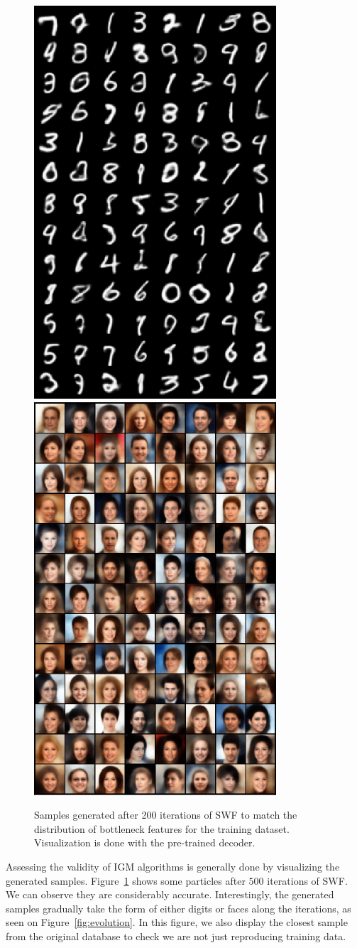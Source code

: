\begin{figure}
\includegraphics[width=0.49\columnwidth]{figures/MNIST_train_image_500.pdf}
\includegraphics[width=0.49\columnwidth]{figures/CelebA_train_image_500.pdf}
\label{fig:samples}\vspace{-0.1cm}
\caption{Samples generated after 200 iterations of SWF to match the distribution of bottleneck features for the training dataset. Visualization is done with the pre-trained decoder.}
\end{figure}

Assessing the validity of IGM algorithms is generally done by visualizing the generated samples. Figure~\ref{fig:samples} shows some particles after $500$ iterations of SWF. We can observe they are considerably accurate. Interestingly, the generated samples gradually take the form of either digits or faces along the iterations, as seen on Figure~\ref{fig:evolution}. In this figure, we also display the closest sample from the original database to check we are not just reproducing training data.

